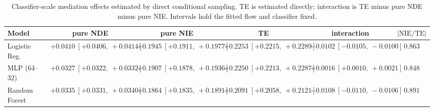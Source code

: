 \begin{table}[htbp]
  \centering
  \caption{Classifier-scale mediation effects estimated by direct conditional sampling. TE is estimated directly; interaction is TE minus pure NDE minus pure NIE. Intervals hold the fitted flow and classifier fixed.}
  \label{tab:german_synth_gap_overall}
  \begin{tabular}{lccccc}
    \toprule
    Model & pure NDE & pure NIE & TE & interaction & $|\mathrm{NIE}/\mathrm{TE}|$ \\
    \midrule
    Logistic Reg. & $+0.0410\ [+0.0406,\ +0.0414]$ & $+0.1945\ [+0.1911,\ +0.1977]$ & $+0.2253\ [+0.2215,\ +0.2289]$ & $-0.0102\ [-0.0105,\ -0.0100]$ & 0.863 \\
    MLP (64--32) & $+0.0327\ [+0.0322,\ +0.0332]$ & $+0.1907\ [+0.1878,\ +0.1936]$ & $+0.2250\ [+0.2213,\ +0.2287]$ & $+0.0016\ [+0.0010,\ +0.0021]$ & 0.848 \\
    Random Forest & $+0.0335\ [+0.0331,\ +0.0340]$ & $+0.1864\ [+0.1835,\ +0.1891]$ & $+0.2091\ [+0.2058,\ +0.2121]$ & $-0.0108\ [-0.0110,\ -0.0106]$ & 0.891 \\
    \bottomrule
  \end{tabular}
\end{table}